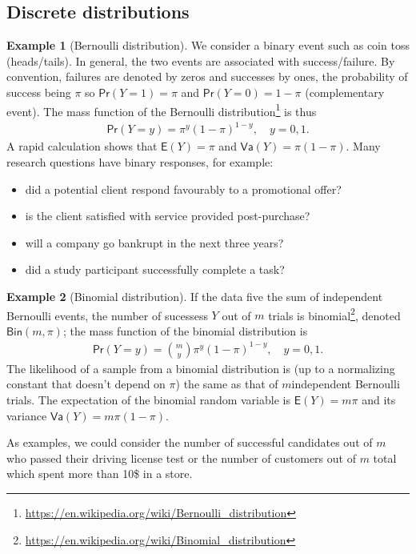 \documentclass[
  11pt,
  letterpaper,
]{book}
\providecommand{\tightlist}{%
  \setlength{\itemsep}{0pt}\setlength{\parskip}{0pt}}
\renewcommand{\href}[2]{#2\footnote{\url{#1}}}
\theoremstyle{definition}
\theoremstyle{definition}
\newtheorem{example}{Example}[chapter]
\theoremstyle{definition}
\theoremstyle{remark}
\begin{document}
\hypertarget{discrete-distributions}{%
\subsection{Discrete distributions}\label{discrete-distributions}}

\begin{example}[Bernoulli distribution]
\protect\hypertarget{exm:bernoullidist}{}{\label{exm:bernoullidist} {} }We consider a binary event such as coin toss (heads/tails). In general, the two events are associated with success/failure. By convention, failures are denoted by zeros and successes by ones, the probability of success being \(\pi\) so \(\mathsf{Pr}(Y=1)=\pi\) and \(\mathsf{Pr}(Y=0)=1-\pi\) (complementary event). The mass function of the \href{https://en.wikipedia.org/wiki/Bernoulli_distribution}{Bernoulli distribution} is thus
\begin{align*}
\mathsf{Pr}(Y=y) = \pi^y (1-\pi)^{1-y}, \quad y=0, 1.
\end{align*}
A rapid calculation shows that \(\mathsf{E}(Y)=\pi\) and \(\mathsf{Va}(Y)=\pi(1-\pi)\).
Many research questions have binary responses, for example:

\begin{itemize}
\tightlist
\item
  did a potential client respond favourably to a promotional offer?
\item
  is the client satisfied with service provided post-purchase?
\item
  will a company go bankrupt in the next three years?
\item
  did a study participant successfully complete a task?
\end{itemize}
\end{example}

\begin{example}[Binomial distribution]
\protect\hypertarget{exm:binomialdist}{}{\label{exm:binomialdist} {} }If the data five the sum of independent Bernoulli events, the number of sucessess \(Y\) out of \(m\) trials is \href{https://en.wikipedia.org/wiki/Binomial_distribution}{binomial}, denoted \(\mathsf{Bin}(m, \pi)\); the mass function of the binomial distribution is
\begin{align*}
\mathsf{Pr}(Y=y) = \binom{m}{y}\pi^y (1-\pi)^{1-y}, \quad y=0, 1.
\end{align*}
The likelihood of a sample from a binomial distribution is (up to a normalizing constant that doesn't depend on \(\pi\)) the same as that of \(m\)independent Bernoulli trials. The expectation of the binomial random variable is \(\mathsf{E}(Y)=m\pi\) and its variance \(\mathsf{Va}(Y)=m\pi(1-\pi)\).

As examples, we could consider the number of successful candidates out of \(m\) who passed their driving license test or the number of customers out of \(m\) total which spent more than 10\$ in a store.
\end{example}
\end{document}
